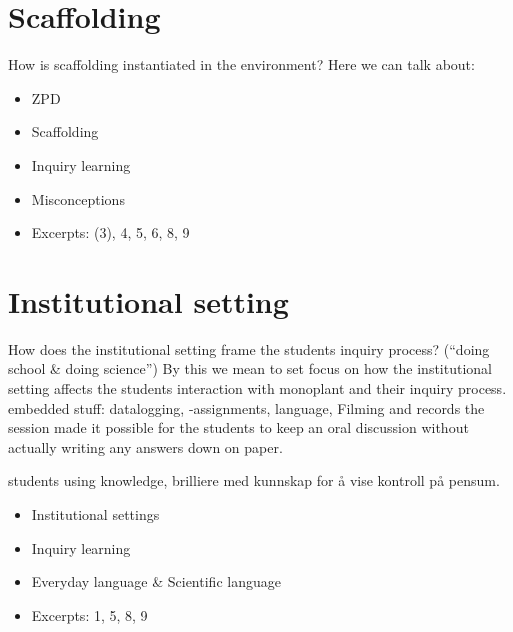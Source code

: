 \section{Scaffolding}
How is scaffolding instantiated in the environment?
Here we can talk about: 
\begin{itemize}
\item{ZPD}
\item{Scaffolding}
\item{Inquiry learning}
\item{Misconceptions}
\item{Excerpts: (3), 4, 5, 6, 8, 9}
\end{itemize}



\section{Institutional setting}
How does the institutional setting frame the students inquiry process? (“doing school \& doing science”)
By this we mean to set focus on how the institutional setting affects the students interaction with monoplant and their inquiry process. 
embedded stuff: datalogging, -assignments, language,
Filming and records the session made it possible for the students to keep an oral discussion without actually writing any answers down on paper. 

students using knowledge, brilliere med kunnskap for å vise kontroll på pensum.

\begin{itemize}
\item{Institutional settings}
\item{Inquiry learning}
\item{Everyday language \& Scientific language}
\item{Excerpts: 1, 5, 8, 9}
\end{itemize}
